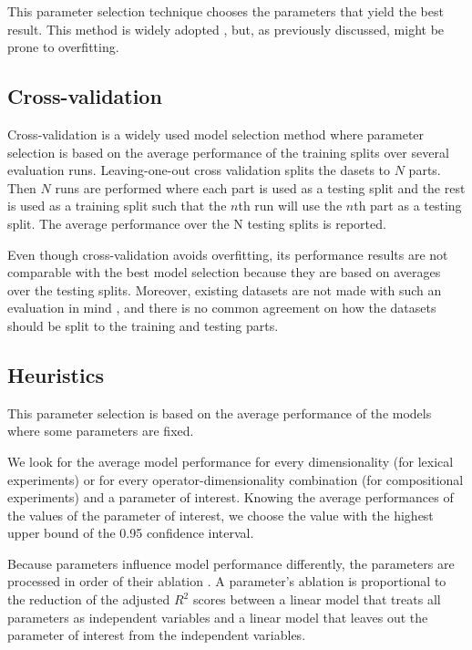 This parameter selection technique chooses the parameters that yield the best result. This method is widely adopted \cite{mitchell-lapata:2008:ACLMain,Grefenstette:2011:ESC:2145432.2145580}, but, as previously discussed, might be prone to overfitting.
%
%

\subsection{Cross-validation}

Cross-validation \cite{Ney1997} is a widely used model selection method where parameter selection is based on the average performance of the training splits over several evaluation runs. Leaving-one-out cross validation splits the dasets to $N$ parts. Then $N$ runs are performed where each part is used as a testing split and the rest is used as a training split such that the $n$th run will use the $n$th part as a testing split. The average performance over the N testing splits is reported.

Even though cross-validation avoids overfitting, its performance results are not comparable with the best model selection because they are based on averages over the testing splits. Moreover, existing datasets are not made with such an evaluation in mind \cite{W16-2506}, and there is no common agreement on how the datasets should be split to the training and testing parts.

\subsection{Heuristics}

This parameter selection is based on the average performance of the models where some parameters are fixed.

We look for the average model performance for every dimensionality (for lexical experiments) or for every operator-dimensionality combination (for compositional experiments) and a parameter of interest. Knowing the average performances of the values of the parameter of interest, we choose the value with the highest upper bound of the 0.95 confidence interval.

Because parameters influence model performance differently, the parameters are processed in order of their ablation \cite{lapesa2014large}. A parameter's ablation is proportional to the reduction of the adjusted $R^2$ scores between a linear model that treats all parameters as independent variables and a linear model that leaves out the parameter of interest from the independent variables.

